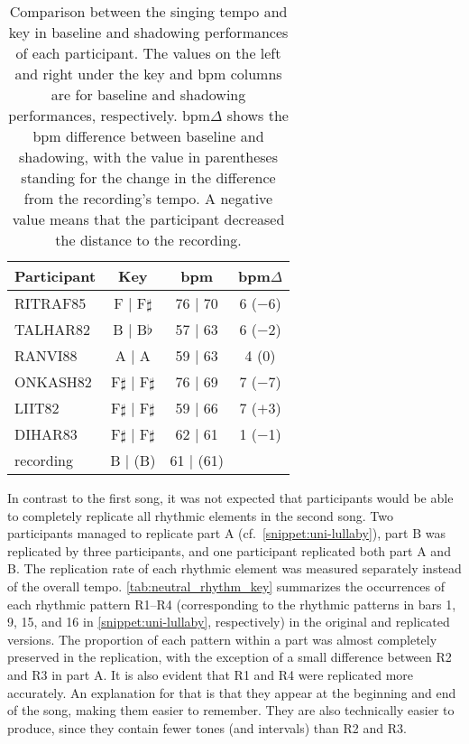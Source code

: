 \begin{table}
	\caption[Key and \acs{bpm} deviation summary]
			{Comparison between the singing tempo and key in baseline and shadowing performances of each participant.
			The values on the left and right under the key and \acs{bpm} columns are for baseline and shadowing performances, respectively.
			\acs{bpm}$\Delta$ shows the \acs{bpm} difference between baseline and shadowing, with the value in parentheses standing for the change in the difference from the recording's tempo.
			A negative value means that the participant decreased the distance to the recording.}
	\label{tab:bpm_and_keys}
	\centering
	\begin{tabularx}{\linewidth}{Xccc}
		\toprule
		\bfseries{Participant}	& \bfseries{Key}			& \bfseries{\acs{bpm}}		& \bfseries{\acs{bpm}$\Delta$}	\\
		\midrule
		RITRAF85				& F  |  F$\sharp$			& 76  |  70					&  6 ($-$6)						\\
		TALHAR82				& B  |  B$\flat$			& 57  |  63					&  6 ($-$2)						\\
		RANVI88					& A  |  A					& 59  |  63					&  4 (\phantom{$-$}0)			\\
		ONKASH82				& F$\sharp$  |  F$\sharp$	& 76  |  69					&  7 ($-$7)						\\
		LIIT82					& F$\sharp$  |  F$\sharp$	& 59  |  66					&  7 ($+$3)						\\
		DIHAR83					& F$\sharp$  |  F$\sharp$	& 62  |  61					&  1 ($-$1)						\\
		\rule{0pt}{0.5cm}%
		recording				& B | (B)					& 61 | (61)					&								\\
		\bottomrule
	\end{tabularx}
\end{table}

In contrast to the first song, it was not expected that participants would be able to completely replicate all rhythmic elements in the second song.
Two participants managed to replicate part A (cf.\ \cref{snippet:uni-lullaby}), part B was replicated by three participants, and one participant replicated both part A and B.
The replication rate of each rhythmic element was measured separately instead of the overall tempo.
\cref{tab:neutral_rhythm_key} summarizes the occurrences of each rhythmic pattern R1--R4 (corresponding to the rhythmic patterns in bars 1, 9, 15, and 16 in \cref{snippet:uni-lullaby}, respectively) in the original and replicated versions.
The proportion of each pattern within a part was almost completely preserved in the replication, with the exception of a small difference between R2 and R3 in part A.
It is also evident that R1 and R4 were replicated more accurately.
An explanation for that is that they appear at the beginning and end of the song, making them easier to remember.
They are also technically easier to produce, since they contain fewer tones (and intervals) than R2 and R3.


